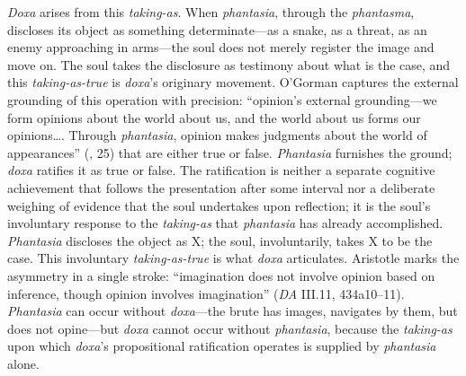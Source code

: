 \documentclass{article}
\begin{document}
\textit{Doxa} arises from this \textit{taking-as}. When \textit{phantasia}, through the \textit{phantasma}, discloses its object as something determinate---as a snake, as a threat, as an enemy approaching in arms---the soul does not merely register the image and move on. The soul takes the disclosure as testimony about what is the case, and this \textit{taking-as-true} is \textit{doxa}'s originary movement. O'Gorman captures the external grounding of this operation with precision: ``opinion's external grounding---we form opinions about the world about us, and the world about us forms our opinions\ldots. Through \textit{phantasia}, opinion makes judgments about the world of appearances'' (\cite{ogorman_aristotles_phantasia}, 25) that are either true or false. \textit{Phantasia} furnishes the ground; \textit{doxa} ratifies it as true or false. The ratification is neither a separate cognitive achievement that follows the presentation after some interval nor a deliberate weighing of evidence that the soul undertakes upon reflection; it is the soul's involuntary response to the \textit{taking-as} that \textit{phantasia} has already accomplished. \textit{Phantasia} discloses the object as X; the soul, involuntarily, takes X to be the case. This involuntary \textit{taking-as-true} is what \textit{doxa} articulates. Aristotle marks the asymmetry in a single stroke: ``imagination does not involve opinion based on inference, though opinion involves imagination'' (\textit{DA} III.11, 434a10--11). \textit{Phantasia} can occur without \textit{doxa}---the brute has images, navigates by them, but does not opine---but \textit{doxa} cannot occur without \textit{phantasia}, because the \textit{taking-as} upon which \textit{doxa}'s propositional ratification operates is supplied by \textit{phantasia} alone.
\end{document}
